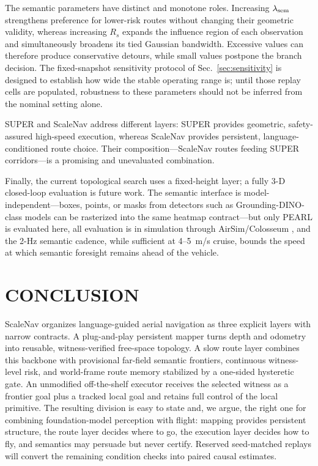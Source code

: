 \documentclass[letterpaper,10pt,conference]{ieeeconf}
\begin{document}
The semantic parameters have distinct and monotone roles.  Increasing
$\lambda_{\rm sem}$ strengthens preference for lower-risk routes without
changing their geometric validity, whereas increasing $R_s$ expands the
influence region of each observation and simultaneously broadens its tied
Gaussian bandwidth.  Excessive values can therefore produce conservative
detours, while small values postpone the branch decision.  The fixed-snapshot
sensitivity protocol of Sec.~\ref{sec:sensitivity} is designed to establish
how wide the stable operating range is; until those replay cells are
populated, robustness to these parameters should not be inferred from the
nominal setting alone.

SUPER \cite{super} and ScaleNav address different layers: SUPER provides
geometric, safety-assured high-speed execution, whereas ScaleNav provides
persistent, language-conditioned route choice.  Their composition---ScaleNav
routes feeding SUPER corridors---is a promising and unevaluated combination.

Finally, the current topological search uses a fixed-height layer; a fully
3-D closed-loop evaluation is future work.  The semantic
interface is model-independent---boxes, points, or masks from detectors such
as Grounding-DINO-class models can be rasterized into the same heatmap
contract---but only PEARL \cite{pearl} is evaluated here, all evaluation is
in simulation through AirSim/Colosseum \cite{airsim}, and the 2-Hz semantic
cadence, while sufficient at 4--5~m/s cruise, bounds the speed at which
semantic foresight remains ahead of the vehicle.

\section{CONCLUSION}
ScaleNav organizes language-guided aerial navigation as three explicit
layers with narrow contracts.  A plug-and-play persistent mapper turns depth
and odometry into reusable, witness-verified free-space topology.  A slow
route layer combines this backbone with provisional far-field semantic
frontiers, continuous witness-level risk, and world-frame route memory
stabilized by a one-sided hysteretic gate.  An unmodified off-the-shelf
executor receives the selected witness as a frontier goal plus a tracked
local goal and retains full control of the local primitive.  The resulting
division is easy
to state and, we argue, the right one for combining foundation-model
perception with flight: mapping provides persistent structure, the route
layer decides where to go, the execution layer decides how to fly, and
semantics may persuade but never certify.  Reserved seed-matched replays will
convert the remaining condition checks into paired causal estimates.
\end{document}
